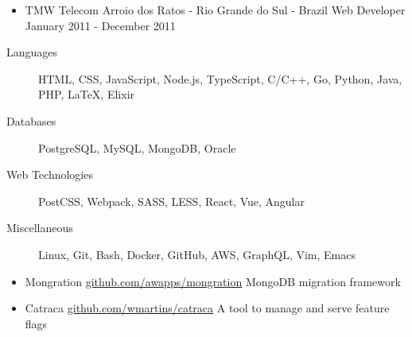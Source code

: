 \documentclass[letterpaper,11pt]{article}
\begin{document}
\begin{itemize}
        \item
            \ressubheading
                {TMW Telecom}
                {Arroio dos Ratos - Rio Grande do Sul - Brazil}
                {Web Developer}
                {January 2011 - December 2011}
            \begin{itemize}
            \end{itemize}
    \end{itemize}

    \begin{description}
        \item[Languages]
            HTML, CSS, JavaScript, Node.js, TypeScript, C/C++, Go, Python, Java, PHP, \LaTeX, Elixir
        \item[Databases]
            PostgreSQL, MySQL, MongoDB, Oracle
        \item[Web Technologies]
            PostCSS, Webpack, SASS, LESS, React, Vue, Angular
        \item[Miscellaneous]
            Linux, Git, Bash, Docker, GitHub, AWS, GraphQL, Vim, Emacs
    \end{description}

    \begin{itemize}
        \item
            \ressubheading
                {Mongration}
                {\href{https://github.com/awapps/mongration}{github.com/awapps/mongration}}
                {MongoDB migration framework}
                {}
        \item
            \ressubheading
                {Catraca}
                {\href{https://github.com/wmartins/catraca}{github.com/wmartins/catraca}}
                {A tool to manage and serve feature flags}
                {}
    \end{itemize}
\end{document}
